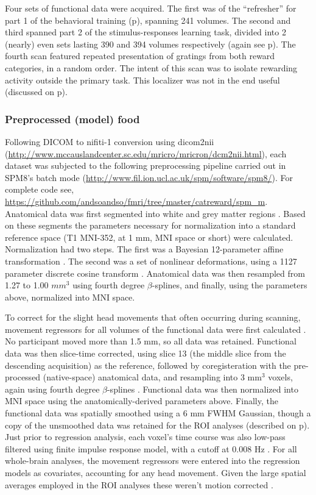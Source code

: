 Four sets of functional data were acquired.  The first was of the ``refresher'' for part 1 of the behavioral training (p\pageref{subsub:whatwhen}), spanning 241 volumes.  The second and third spanned part 2 of the stimulus-responses learning task, divided into 2 (nearly) even sets lasting 390 and 394 volumes respectively (again see p\pageref{subsub:whatwhen}).  The fourth scan featured repeated presentation of gratings from both reward categories, in a random order.  The intent of this scan was to isolate rewarding activity outside the primary task. This localizer was not in the end useful (discussed on p\pageref{subsub:chunks}).

\subsubsection{Preprocessed (model) food}
\label{subsub:preprocessed}
Following DICOM to nifiti-1 conversion using dicom2nii (\url{http://www.mccauslandcenter.sc.edu/mricro/mricron/dcm2nii.html}), each dataset was subjected to the following preprocessing pipeline carried out in SPM8's batch mode (\url{http://www.fil.ion.ucl.ac.uk/spm/software/spm8/}).  For complete code see, \url{https://github.com/andsoandso/fmri/tree/master/catreward/spm\_m}.  Anatomical data was first segmented into white and grey matter regions \cite{Collignon:1995p9347}.  Based on these segments the parameters necessary for normalization into a standard reference space (T1 MNI-352, at 1 mm, MNI space or short) were calculated. Normalization had two steps.  The first was a Bayesian 12-parameter affine transformation \cite{Ashburner:1997p9348}.  The second was a set of nonlinear deformations, using a 1127 parameter discrete cosine transform \cite{Ashburner:1999p9350}.  Anatomical data was then resampled from 1.27 to 1.00 $mm^3$ using fourth degree $\beta$-splines, and finally, using the parameters above, normalized into MNI space.

To correct for the slight head movements that often occurring during scanning, movement regressors for all volumes of the functional data were first calculated \cite{Ashburner:1999p9350}.  No participant moved more than 1.5 mm, so all data was retained.  Functional data was then slice-time corrected, using slice 13 (the middle slice from the descending acquisition) as the reference, followed by coregisteration with the pre-processed (native-space) anatomical data, and resampling into 3 mm$^3$ voxels, again using fourth degree $\beta$-splines \cite{Collignon:1995p9347}.  Functional data was then normalized into MNI space using the anatomically-derived parameters above.  Finally, the functional data was spatially smoothed using a 6 mm FWHM Gaussian, though a copy of the unsmoothed data was retained for the ROI analyses (described on p\pageref{sub:regoins}).  Just prior to regression analysis, each voxel's time course was also low-pass filtered using finite impulse response model, with a cutoff at 0.008 Hz \cite{Kruggel:1999p9351}.  For all whole-brain analyses, the movement regressors were entered into the regression models as covariates, accounting for any head movement.  Given the large spatial averages employed in the ROI analyses these weren't motion corrected \cite{Poldrack:2007p8572}.

